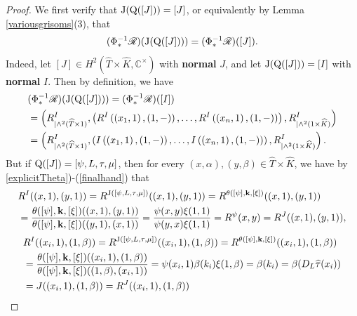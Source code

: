 \documentclass{amsart}
\theoremstyle{definition}
\numberwithin{equation}{section}
\begin{document}
\begin{proof}
We first verify that ${\rm J}({\rm Q}([J]))=[J]$, or equivalently by Lemma \ref{variousgrisoms}(3), that
$$(\Phi^{-1}_*\mathscr{R})({\rm J}({\rm Q}([J])))=(\Phi^{-1}_*\mathscr{R})([J]).$$
Indeed, let $[J]\in H^2(\widehat{T}\times \widehat{K},\mathbb{C}^{\times})$ with {\bf normal} $J$, and let ${\rm J}({\rm Q}([J]))=[I]$ with {\bf normal} $I$. Then by definition, we have
\begin{equation*}
\begin{split}
& (\Phi^{-1}_*\mathscr{R})({\rm J}({\rm Q}([J])))=(\Phi^{-1}_*\mathscr{R})([I])\\
&=\left(R^{I}_{\mid \wedge^2(\widehat{T}\times 1)},\left(R^{I}\left(\left(x_1,1\right),\left(1,-\right)\right),\dots,R^{I}\left(\left(x_n,1\right),\left(1,-\right)\right)\right),R^{I}_{\mid \wedge^2(1\times \widehat{K})}\right)\\
&=\left(R^{I}_{\mid \wedge^2(\widehat{T}\times 1)},\left(I\left(\left(x_1,1\right),\left(1,-\right)\right),\dots,I\left(\left(x_n,1\right),\left(1,-\right)\right)\right),R^{I}_{\mid \wedge^2(1\times \widehat{K})}\right).
\end{split}
\end{equation*}
But if ${\rm Q}([J])=[\psi,L,\tau,\mu]$, 
then for every $(x,\alpha),(y,\beta)\in \widehat{T}\times \widehat{K}$, we have by \ref{explicitTheta})-(\ref{finalhand}) that
\begin{equation*}
\begin{split}
& R^{I}((x,1),(y,1))=R^{{\rm J}([\psi,L,\tau,\mu])}((x,1),(y,1))=R^{\theta([\psi],{\bf k},[\xi])}((x,1),(y,1))\\
& =\frac{\theta([\psi],{\bf k},[\xi])((x,1),(y,1))}{\theta([\psi],{\bf k},[\xi])((y,1),(x,1))}=\frac{\psi(x,y)\xi(1,1)}{\psi(y,x)\xi(1,1)}=R^{\psi}(x,y)=R^{J}((x,1),(y,1)),
\end{split}
\end{equation*}
\begin{equation*}
\begin{split}
& R^{I}((x_i,1),(1,\beta))=R^{{\rm J}([\psi,L,\tau,\mu])}((x_i,1),(1,\beta))=R^{\theta([\psi],{\bf k},[\xi])}((x_i,1),(1,\beta))\\
& =\frac{\theta([\psi],{\bf k},[\xi])((x_i,1),(1,\beta))}{\theta([\psi],{\bf k},[\xi])((1,\beta),(x_i,1))}=\psi(x_i,1)\beta(k_i)\xi(1,\beta)=\beta(k_i)=
\beta(D_L\widehat{\tau}(x_i))\\
&=J((x_i,1),(1,\beta))=R^J((x_i,1),(1,\beta))
\end{split}
\end{equation*}

\end{proof}
\end{document}
